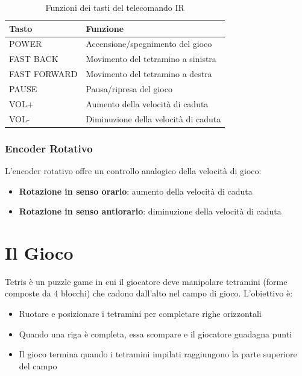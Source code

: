 \documentclass[a4paper, 12pt]{article}
\begin{document}
\begin{table}[H]
	\centering
	\caption{Funzioni dei tasti del telecomando IR}
	\label{tab:ir-functions}
	\begin{tabular}{ll}
		\toprule
		\textbf{Tasto} & \textbf{Funzione}                     \\
		\midrule
		POWER          & Accensione/spegnimento del gioco      \\
		FAST BACK      & Movimento del tetramino a sinistra    \\
		FAST FORWARD   & Movimento del tetramino a destra      \\
		PAUSE          & Pausa/ripresa del gioco               \\
		VOL+           & Aumento della velocità di caduta     \\
		VOL-           & Diminuzione della velocità di caduta \\
		\bottomrule
	\end{tabular}
\end{table}

\subsubsection{Encoder Rotativo}
\label{subsubsec:encoder}
L'encoder rotativo offre un controllo analogico della velocità di gioco:
\begin{itemize}
	\item \textbf{Rotazione in senso orario}: aumento della velocità di caduta
	\item \textbf{Rotazione in senso antiorario}: diminuzione della velocità di caduta
\end{itemize}

\section{Il Gioco}
\label{sec:gioco}
Tetris è un puzzle game in cui il giocatore deve manipolare tetramini (forme composte da 4 blocchi) che cadono dall'alto nel campo di gioco. L'obiettivo è:
\begin{itemize}
	\item Ruotare e posizionare i tetramini per completare righe orizzontali
	\item Quando una riga è completa, essa scompare e il giocatore guadagna punti
	\item Il gioco termina quando i tetramini impilati raggiungono la parte superiore del campo
\end{itemize}
\end{document}

